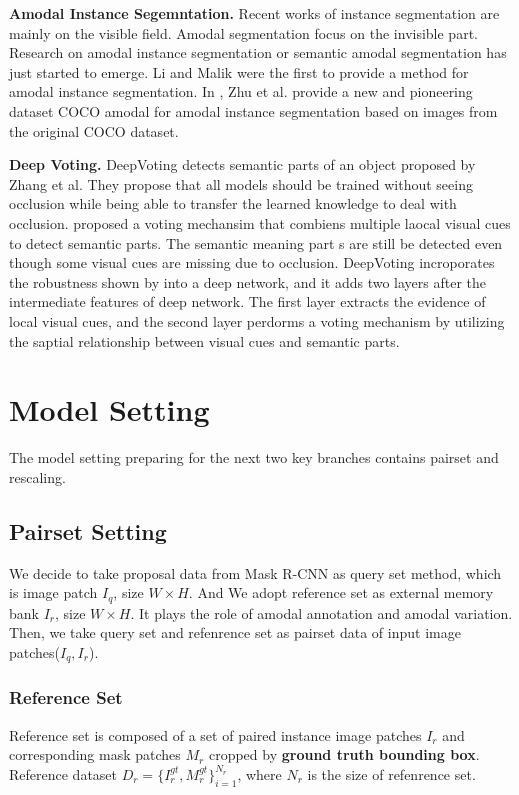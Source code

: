 \documentclass[10pt,twocolumn,letterpaper]{article}
\begin{document}
\textbf{Amodal Instance Segemntation. }Recent works of instance segmentation are mainly on the visible field. Amodal segmentation focus on the invisible part. Research on amodal instance segmentation or semantic amodal segmentation has just started to emerge. Li and Malik \cite{ehsani2017segan} were the first to provide a method for amodal instance segmentation. In \cite{li2017scene}, Zhu et al. provide a new and pioneering
dataset COCO amodal for amodal instance segmentation based on images from
the original COCO \cite{lin2014microsoft} dataset. 



\textbf{Deep Voting. }
DeepVoting detects semantic parts of an object proposed by Zhang et al. They propose that all models should be trained without seeing occlusion while being able to transfer the learned knowledge to deal with occlusion.\cite{wang2017detecting} proposed a voting mechansim that combiens multiple laocal visual cues to detect semantic parts. The semantic meaning part s are still be detected even though some visual cues are missing due to occlusion. DeepVoting incroporates the robustness shown by \cite{wang2017detecting} into a deep network, and it adds two layers after the intermediate features of deep network. The first layer extracts the evidence of local visual cues, and the second layer perdorms a voting mechanism by utilizing the saptial relationship between visual cues and semantic parts.



\section{Model Setting}
The model setting preparing for the next two key branches contains pairset and rescaling.
\subsection{Pairset Setting}
We decide to take proposal data from Mask R-CNN as query set method,  which is image patch  $I_q$, size $W \times H$. And We adopt reference set as external memory bank  $I_r$, size $W \times H$. It plays the role of amodal annotation and amodal variation.
Then, we take query set and refenrence set as pairset data of input image patches($I_q, I_r$).
\subsubsection{Reference Set}

Reference set is composed of a set of paired instance image patches $I_r $ and corresponding mask patches $M_r$
cropped by {\bf ground truth bounding box}. Reference dataset
$D_{r} = \{I_r^{gt}, M_r^{gt}\}^{N_r}_{i=1}$, where $N_r$ is the size of refenrence set.
\end{document}
